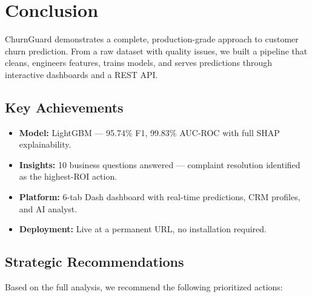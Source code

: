 \documentclass[11pt,a4paper]{article}
\begin{document}
\section{Conclusion}

ChurnGuard demonstrates a complete, production-grade approach to customer churn prediction. From a raw dataset with quality issues, we built a pipeline that cleans, engineers features, trains models, and serves predictions through interactive dashboards and a REST API.

\subsection{Key Achievements}

\begin{itemize}[leftmargin=*, label=\textcolor{success}{\faCheckCircle}]
    \item \textbf{Model:} LightGBM --- 95.74\% F1, 99.83\% AUC-ROC with full SHAP explainability.
    \item \textbf{Insights:} 10 business questions answered --- complaint resolution identified as the highest-ROI action.
    \item \textbf{Platform:} 6-tab Dash dashboard with real-time predictions, CRM profiles, and AI analyst.
    \item \textbf{Deployment:} Live at a permanent URL, no installation required.
\end{itemize}

\subsection{Strategic Recommendations}

Based on the full analysis, we recommend the following prioritized actions:
\end{document}
